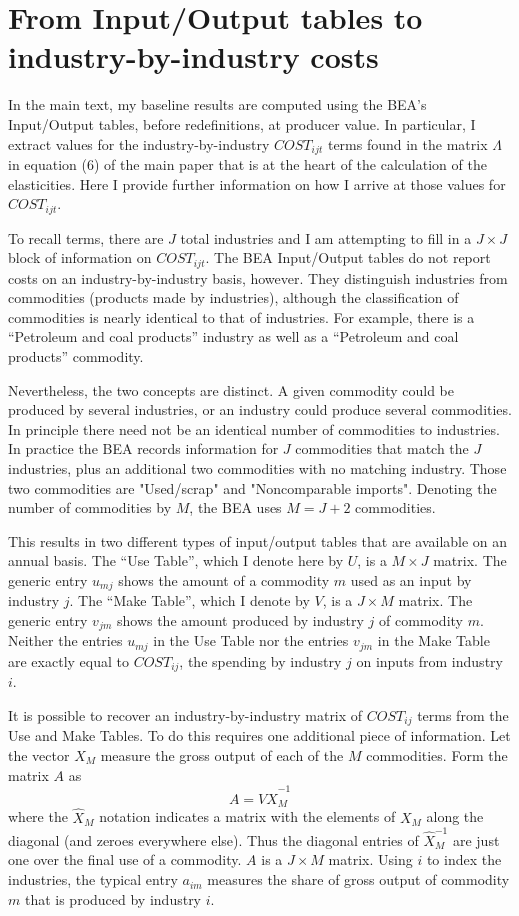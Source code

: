 \documentclass[11pt]{article}
\begin{document}
\section{From Input/Output tables to industry-by-industry costs} \label{SEC_io}
In the main text, my baseline results are computed using the BEA's Input/Output tables, before redefinitions, at producer value. In particular, I extract values for the industry-by-industry $COST_{ijt}$ terms found in the matrix $\Lambda$ in equation (6) of the main paper that is at the heart of the calculation of the elasticities. Here I provide further information on how I arrive at those values for $COST_{ijt}$. 

To recall terms, there are $J$ total industries and I am attempting to fill in a $J \times J$ block of information on $COST_{ijt}$. The BEA Input/Output tables do not report costs on an industry-by-industry basis, however. They distinguish industries from commodities (products made by industries), although the classification of commodities is nearly identical to that of industries. For example, there is a ``Petroleum and coal products'' industry as well as a ``Petroleum and coal products'' commodity. 

Nevertheless, the two concepts are distinct. A given commodity could be produced by several industries, or an industry could produce several commodities. In principle there need not be an identical number of commodities to industries. In practice the BEA records information for $J$ commodities that match the $J$ industries, plus an additional two commodities with no matching industry. Those two commodities are "Used/scrap" and "Noncomparable imports". Denoting the number of commodities by $M$, the BEA uses $M = J + 2$ commodities. 

This results in two different types of input/output tables that are available on an annual basis. The ``Use Table'', which I denote here by $U$, is a $M \times J$ matrix. The generic entry $u_{mj}$ shows the amount of a commodity $m$ used as an input by industry $j$. The ``Make Table'', which I denote by $V$, is a $J \times M$ matrix. The generic entry $v_{jm}$ shows the amount produced by industry $j$ of commodity $m$. Neither the entries $u_{mj}$ in the Use Table nor the entries $v_{jm}$ in the Make Table are exactly equal to $COST_{ij}$, the spending by industry $j$ on inputs from industry $i$. 

It is possible to recover an industry-by-industry matrix of $COST_{ij}$ terms from the Use and Make Tables. To do this requires one additional piece of information. Let the vector $X_M$ measure the gross output of each of the $M$ commodities. Form the matrix $A$ as
\begin{equation}
	A = V \hat{X}_M^{-1}
\end{equation}
where the $\hat{X}_M$ notation indicates a matrix with the elements of $X_M$ along the diagonal (and zeroes everywhere else). Thus the diagonal entries of $\hat{X}_M^{-1}$ are just one over the final use of a commodity. $A$ is a $J \times M$ matrix. Using $i$ to index the industries, the typical entry $a_{im}$ measures the share of gross output of commodity $m$ that is produced by industry $i$. 
\end{document}

